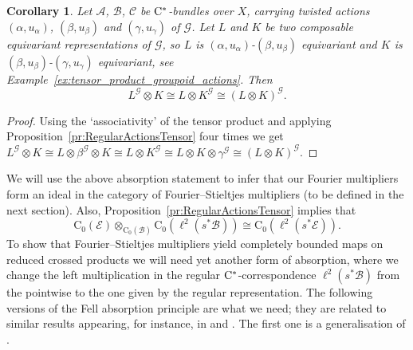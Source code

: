\documentclass[11 pt, leqno]{amsart}
\numberwithin{equation}{section}
\theoremstyle{plain}
\newtheorem{cor}[thm]{Corollary}
\theoremstyle{definition}
\newcommand*{\contz}{\mathrm{C_0}}%
\newcommand{\B}{\mathcal B}
\newcommand{\G}{\mathcal G} %
\newcommand{\CC}{\mathcal C}
\newcommand{\EE}{\mathcal E}
\newcommand{\A}{\mathcal A}
\newcommand{\cst}{\ifmmode\mathrm{C}^*\else{$\mathrm{C}^*$}\fi}
\begin{document}
\begin{cor}\label{cor:regular_equivariant_absorbtion}
Let $\A$, $\B$, $\CC$ be $\cst$-bundles over $X$, carrying twisted actions $(\alpha,u_\alpha)$, $(\beta,u_\beta)$ and $(\gamma, u_\gamma)$ of $\G$. 
Let $L$ and $K$ be two composable equivariant representations of $\G$, so $L$ is   $(\alpha,u_{\alpha})$-$(\beta,u_{\beta})$ equivariant and $K$ is $(\beta,u_{\beta})$-$(\gamma,u_{\gamma})$ equivariant, see Example~\ref{ex:tensor_product_groupoid_actions}. 
Then 
\[
    L^\G\otimes K\cong  L\otimes K^\G \cong (L\otimes K)^\G .
\]
\end{cor}
\begin{proof}
Using the `associativity' of the tensor product and applying Proposition~\ref{pr:RegularActionsTensor} four times we get $L^\G\otimes K\cong  L\otimes \beta^\G \otimes K \cong L\otimes K^\G \cong L\otimes K \otimes \gamma^\G \cong (L\otimes K)^\G$. 
\end{proof}

We will use the above absorption statement to infer that our Fourier multipliers form an ideal in the category of Fourier--Stieltjes multipliers (to be defined in the next section). 
Also, Proposition~\ref{pr:RegularActionsTensor} implies that 
\[
    \contz(\EE) \otimes_{\contz(\B)} \contz(\ell^2(s^*\B)) \cong\contz(\ell^2(s^*\EE)).
\]
To show that Fourier--Stieltjes multipliers yield completely bounded maps on reduced crossed products we will need yet another form of absorption, where we change the left multiplication in the regular $\cst$-correspondence $\ell^2(s^*\B)$ from the pointwise to the one given by the regular representation. 
The following versions of the Fell absorption principle are what we need; they are related to similar results appearing, for instance, in \cite[Lemma 2]{Sims_Williams} and \cite[Theorem 3.20]{BussMartinez}. 
The first one is a generalisation of \cite[Theorem 4.10]{BedosConti}.
\end{document}
